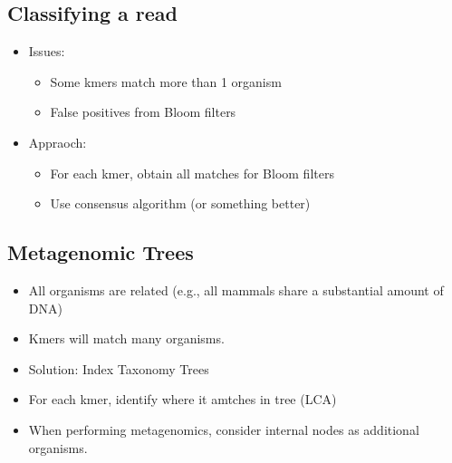 \documentclass[10pt]{article}
\begin{document}
\subsection*{Classifying a read}
\begin{itemize}
    \item Issues:
    \begin{itemize}
        \item Some kmers match more than 1 organism
        \item False positives from Bloom filters
    \end{itemize}
    \item Appraoch:
    \begin{itemize}
        \item For each kmer, obtain all matches for Bloom filters
        \item Use consensus algorithm (or something better)
    \end{itemize}
\end{itemize}

\subsection*{Metagenomic Trees}
\begin{itemize}
    \item All organisms are related (e.g., all mammals share a substantial amount of DNA)
    \item Kmers will match many organisms.
    \item Solution: Index Taxonomy Trees
    \item For each kmer, identify where it amtches in tree (LCA)
    \item When performing metagenomics, consider internal nodes as additional organisms.
\end{itemize}
\end{document}
